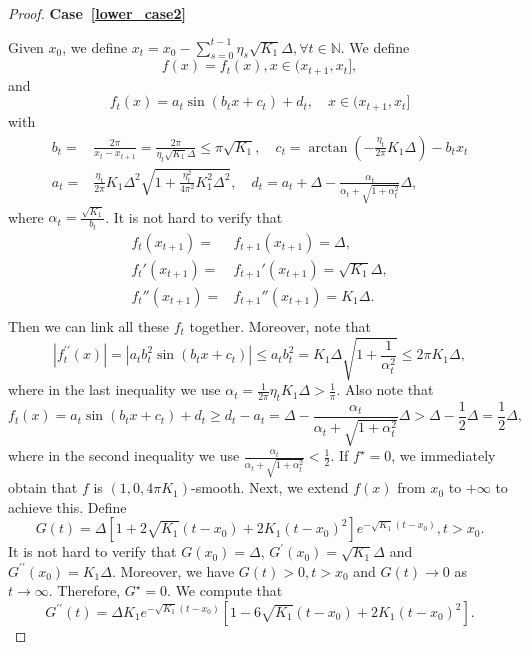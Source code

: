 \documentclass{article}
\begin{document}
\begin{proof}
\textbf{Case~\ref{lower_case2}}

Given $x_0$, we define $x_t=x_0-\sum_{s=0}^{t-1}\eta_s\sqrt{K_1}\Delta,\forall t\in\mathbb{N}$.
We define 
$$f(x)=f_t(x),x\in(x_{t+1},x_t],$$
and
\begin{equation}\nonumber
    f_t(x) = a_t \sin(b_t x+c_t) + d_t, \quad x\in (x_{t+1}, x_t]
\end{equation}
with
\begin{align*}
    b_t =& \frac{2 \pi}{x_{t} - x_{t+1}} = \frac{2\pi}{\eta_t \sqrt{K_1} \Delta} \le \pi \sqrt{K_1} , \quad
    c_t = \arctan\left( - \frac{\eta_t}{2 \pi }K_1 \Delta \right) - b_t x_t \\
    a_t =&\frac{\eta_t}{2 \pi} K_1 \Delta^2 \sqrt{1 + \frac{\eta_t^2}{4\pi^2 } K_1^2 \Delta^2} , \quad 
    d_t = a_t+\Delta-\frac{\alpha_t}{\alpha_t+\sqrt{1+\alpha_t^2}}\Delta,
\end{align*}
where $\alpha_t=\frac{\sqrt{K_1}}{b_t}$. It is not hard to verify that
\begin{align*}
        f_t(x_{t+1}) =& f_{t+1}(x_{t+1}) = \Delta, \\
        f_t'(x_{t+1}) =& f_{t+1}'(x_{t+1}) = \sqrt{K_1} \Delta, \\
        f_t''(x_{t+1}) =& f_{t+1}''(x_{t+1}) = K_1 \Delta. \\
    \end{align*}
Then we can link all these $f_t$ together.
Moreover, note that
$$
\left|f_t^{\prime \prime}(x)\right|=\left|a_t b_t^2 \sin \left(b_t x+c_t\right)\right| \leq a_t b_t^2=K_1 \Delta \sqrt{1+\frac{1}{\alpha_t^2}} \leq 2 \pi K_1 \Delta,
$$
where in the last inequality we use $\alpha_t=\frac{1}{2 \pi} \eta_t K_1 \Delta>\frac{1}{\pi}$. Also note that
$$
f_t(x)=a_t \sin \left(b_t x+c_t\right)+d_t \geq d_t-a_t=\Delta-\frac{\alpha_t}{\alpha_t+\sqrt{1+\alpha_t^2}} \Delta>\Delta-\frac{1}{2} \Delta=\frac{1}{2} \Delta,
$$
where in the second inequality we use $\frac{\alpha_t}{\alpha_t+\sqrt{1+\alpha_t^2}}<\frac{1}{2}$.
If $f^\star=0$, we immediately obtain that $f$ is $(1,0,4\pi K_1)$-smooth. Next, we extend $f(x)$ from $x_0$ to $+\infty$ to achieve this.
Define 
$$
G(t)=\Delta\left[1+2 \sqrt{K_1}\left(t-x_0\right)+2 K_1\left(t-x_0\right)^2\right] e^{-\sqrt{K_1}\left(t-x_0\right)}, t>x_0.
$$
It is not hard to verify that $G(x_0)=\Delta$, $G^\prime(x_0)=\sqrt{K_1}\Delta$ and $G^{\prime\prime}(x_0)=K_1\Delta$. Moreover, we have $G(t)>0,t>x_0$ and $G(t)\to 0$ as $t\to\infty$. Therefore, $G^\star=0$. We compute that
$$
G^{\prime \prime}(t)=\Delta K_1 e^{-\sqrt{K_1}\left(t-x_0\right)}\left[1-6 \sqrt{K_1}\left(t-x_0\right)+2 K_1\left(t-x_0\right)^2\right].
$$
\end{proof}
\end{document}
